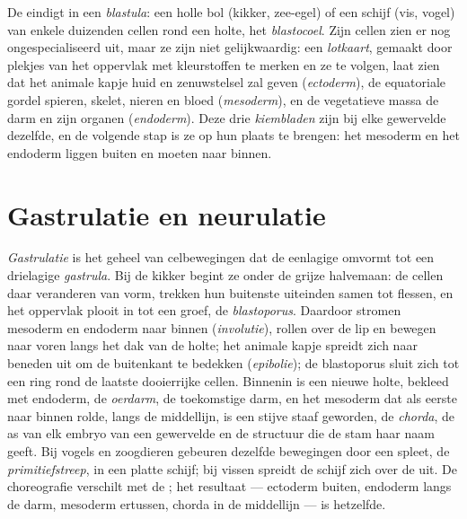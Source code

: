 \begin{definition}[Blastula]\label{def:b2:vertebrate-development:blastula}
De  eindigt in een \emph{blastula}: een holle bol (kikker,
zee-egel) of een schijf (vis, vogel) van enkele duizenden cellen rond een
holte, het \emph{blastocoel}. Zijn cellen zien er nog ongespecialiseerd
uit, maar ze zijn niet gelijkwaardig: een \emph{lotkaart}, gemaakt door
plekjes van het oppervlak met kleurstoffen te merken en ze te volgen, laat
zien dat het animale kapje huid en zenuwstelsel zal geven
(\emph{ectoderm}), de equatoriale gordel spieren, skelet, nieren en bloed
(\emph{mesoderm}), en de vegetatieve massa de darm en zijn organen
(\emph{endoderm}). Deze drie \emph{kiembladen} zijn bij elke gewervelde
dezelfde, en de volgende stap is ze op hun plaats te brengen: het mesoderm
en het endoderm liggen buiten en moeten naar binnen.
\end{definition}

\section{Gastrulatie en neurulatie}

\begin{proposition}[Gastrulatie]\label{prop:b2:vertebrate-development:gastrulation}
\emph{Gastrulatie} is het geheel van celbewegingen dat de eenlagige
 omvormt tot een drielagige \emph{gastrula}. Bij de kikker begint
ze onder de grijze halvemaan: de cellen daar veranderen van vorm, trekken
hun buitenste uiteinden samen tot flessen, en het oppervlak plooit in tot
een groef, de \emph{blastoporus}. Daardoor stromen mesoderm en endoderm naar
binnen (\emph{involutie}), rollen over de lip en bewegen naar voren langs het
dak van de holte; het animale kapje spreidt zich naar beneden uit om de
buitenkant te bedekken (\emph{epibolie}); de blastoporus sluit zich tot een
ring rond de laatste dooierrijke cellen. Binnenin is een nieuwe holte,
bekleed met endoderm, de \emph{oerdarm}, de toekomstige darm, en het
mesoderm dat als eerste naar binnen rolde, langs de middellijn, is een
stijve staaf geworden, de \emph{chorda}, de as van elk embryo van een
gewervelde en de structuur die de stam haar naam geeft. Bij vogels en
zoogdieren gebeuren dezelfde bewegingen door een spleet, de
\emph{primitiefstreep}, in een platte schijf; bij vissen spreidt de schijf
zich over de  uit. De choreografie verschilt met de ; het
resultaat --- ectoderm buiten, endoderm langs de darm, mesoderm ertussen,
chorda in de middellijn --- is hetzelfde.
\end{proposition}

